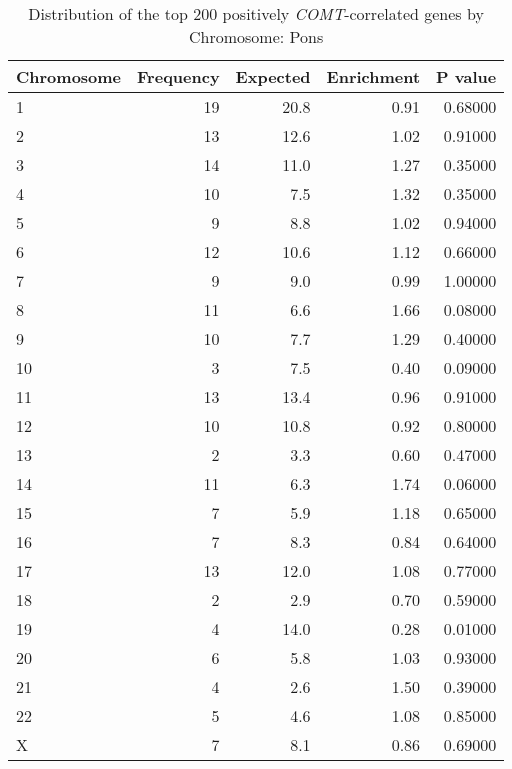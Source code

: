 \begin{longtable}{lrrrr}
\caption{Distribution of the top 200 positively \textit{COMT}-correlated genes by \\ Chromosome: Pons} \\ 
  \toprule
Chromosome & Frequency & Expected & Enrichment & P value \\ 
  \midrule
1 & 19 & 20.8 & 0.91 & 0.68000 \\ 
  2 & 13 & 12.6 & 1.02 & 0.91000 \\ 
  3 & 14 & 11.0 & 1.27 & 0.35000 \\ 
  4 & 10 & 7.5 & 1.32 & 0.35000 \\ 
  5 & 9 & 8.8 & 1.02 & 0.94000 \\ 
  6 & 12 & 10.6 & 1.12 & 0.66000 \\ 
  7 & 9 & 9.0 & 0.99 & 1.00000 \\ 
  8 & 11 & 6.6 & 1.66 & 0.08000 \\ 
  9 & 10 & 7.7 & 1.29 & 0.40000 \\ 
  10 & 3 & 7.5 & 0.40 & 0.09000 \\ 
  11 & 13 & 13.4 & 0.96 & 0.91000 \\ 
  12 & 10 & 10.8 & 0.92 & 0.80000 \\ 
  13 & 2 & 3.3 & 0.60 & 0.47000 \\ 
  14 & 11 & 6.3 & 1.74 & 0.06000 \\ 
  15 & 7 & 5.9 & 1.18 & 0.65000 \\ 
  16 & 7 & 8.3 & 0.84 & 0.64000 \\ 
  17 & 13 & 12.0 & 1.08 & 0.77000 \\ 
  18 & 2 & 2.9 & 0.70 & 0.59000 \\ 
  19 & 4 & 14.0 & 0.28 & 0.01000 \\ 
  20 & 6 & 5.8 & 1.03 & 0.93000 \\ 
  21 & 4 & 2.6 & 1.50 & 0.39000 \\ 
  22 & 5 & 4.6 & 1.08 & 0.85000 \\ 
  X & 7 & 8.1 & 0.86 & 0.69000 \\ 
   \bottomrule
\end{longtable}
